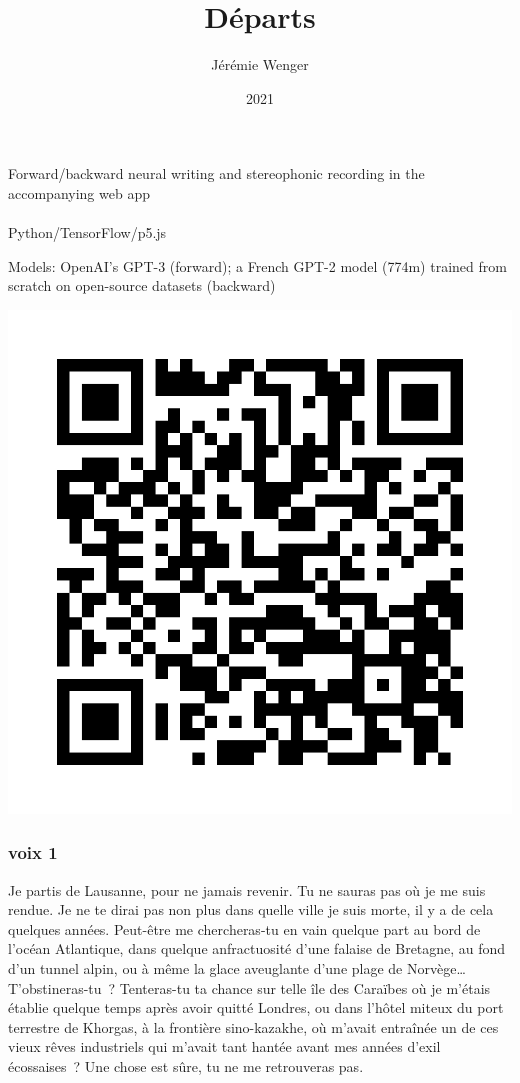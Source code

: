 \documentclass[
  extrafontsizes,
  oneside,
  14pt
]{memoir}
\title{Départs}
\author{Jérémie Wenger}
\date{2021}
\begin{document}
\maketitle

\vfill

\noindent Forward/backward neural writing and stereophonic recording in the accompanying web app
\\
\\
Python/TensorFlow/p5.js

\noindent Models: OpenAI's GPT-3 (forward); a French GPT-2 model (774m)
trained from scratch on open-source datasets (backward)

\includegraphics{qr}

\newpage

\subsubsection{voix 1}\label{voix-1}

Je partis de Lausanne, pour ne jamais revenir. Tu ne sauras pas où je me suis
rendue. Je ne te dirai pas non plus dans quelle ville je suis morte, il y a de
cela quelques années. Peut-être me chercheras-tu en vain quelque part au bord
de l'océan Atlantique, dans quelque anfractuosité d'une falaise de Bretagne, au
fond d'un tunnel alpin, ou à même la glace aveuglante d'une plage de
Norvège\ldots{} T'obstineras-tu~? Tenteras-tu ta chance sur telle île des
Caraïbes où je m'étais établie quelque temps après avoir quitté Londres, ou
dans l'hôtel miteux du port terrestre de Khorgas, à la frontière sino-kazakhe,
où m'avait entraînée un de ces vieux rêves industriels qui m'avait tant hantée
avant mes années d'exil écossaises~? Une chose est sûre, tu ne me retrouveras
pas.
\end{document}
